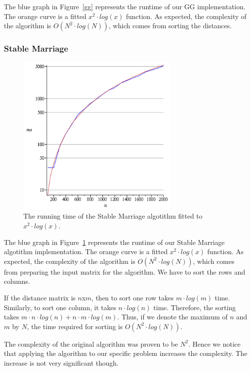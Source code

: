 \documentclass[a4paper,11pt]{article}
\begin{document}
The blue graph in Figure~\ref{gg} represents the runtime of our GG implementation. The orange curve is a fitted $x^2 \cdot log(x)$ function. As expected, the complexity of the algorithm is $O(N^{2} \cdot log(N))$, which comes from sorting the distances.

\subsubsection{Stable Marriage}

\begin{figure}[ht!]
\centering 
\includegraphics[width=80mm]{SM_runtime.png}
\caption{The running time of the Stable Marriage algotithm fitted to $x^2 \cdot log(x)$.}
\label{sm} 
\end{figure}

The blue graph in Figure~\ref{sm} represents the runtime of our Stable Marriage algotithm implementation. The orange curve is a fitted $x^2 \cdot log(x)$ function. As expected, the complexity of the algorithm is $O(N^{2} \cdot log(N))$, which comes from preparing the input matrix for the algorithm. We have to sort the rows and columns.

  If the distance matrix is $n$x$m$, then to sort one row takes $m \cdot log(m)$ time. Similarly, to sort one column, it takes $n \cdot log(n)$ time. Therefore, the sorting takes $m \cdot n \cdot log(n) + n \cdot m \cdot log(m)$. Thus, if we denote the maximum of $n$ and $m$ by $N$, the time required for sorting is $O(N^{2} \cdot log(N))$. 

The complexity of the original algorithm was proven to be $N^{2}$. Hence we notice that applying the algorithm to our specific problem increases the complexity. The increase is not very significant though.
\end{document}
